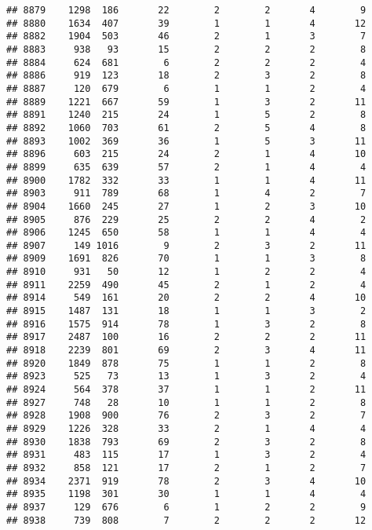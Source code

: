\documentclass[]{article}
\begin{document}
\begin{verbatim}
## 8879    1298  186       22        2        2       4        9
## 8880    1634  407       39        1        1       4       12
## 8882    1904  503       46        2        1       3        7
## 8883     938   93       15        2        2       2        8
## 8884     624  681        6        2        2       2        4
## 8886     919  123       18        2        3       2        8
## 8887     120  679        6        1        1       2        4
## 8889    1221  667       59        1        3       2       11
## 8891    1240  215       24        1        5       2        8
## 8892    1060  703       61        2        5       4        8
## 8893    1002  369       36        1        5       3       11
## 8896     603  215       24        2        1       4       10
## 8899     635  639       57        2        1       4        4
## 8900    1782  332       33        1        1       4       11
## 8903     911  789       68        1        4       2        7
## 8904    1660  245       27        1        2       3       10
## 8905     876  229       25        2        2       4        2
## 8906    1245  650       58        1        1       4        4
## 8907     149 1016        9        2        3       2       11
## 8909    1691  826       70        1        1       3        8
## 8910     931   50       12        1        2       2        4
## 8911    2259  490       45        2        1       2        4
## 8914     549  161       20        2        2       4       10
## 8915    1487  131       18        1        1       3        2
## 8916    1575  914       78        1        3       2        8
## 8917    2487  100       16        2        2       2       11
## 8918    2239  801       69        2        3       4       11
## 8920    1849  878       75        1        1       2        8
## 8923     525   73       13        1        3       2        4
## 8924     564  378       37        1        1       2       11
## 8927     748   28       10        1        1       2        8
## 8928    1908  900       76        2        3       2        7
## 8929    1226  328       33        2        1       4        4
## 8930    1838  793       69        2        3       2        8
## 8931     483  115       17        1        3       2        4
## 8932     858  121       17        2        1       2        7
## 8934    2371  919       78        2        3       4       10
## 8935    1198  301       30        1        1       4        4
## 8937     129  676        6        1        2       2        9
## 8938     739  808        7        2        2       2       12

\end{verbatim}
\end{document}
